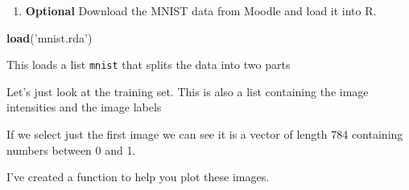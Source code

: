 \documentclass[]{book}
\newenvironment{Shaded}{\begin{snugshade}}{\end{snugshade}}
\newcommand{\CommentTok}[1]{\textcolor[rgb]{0.56,0.35,0.01}{\textit{#1}}}
\newcommand{\DecValTok}[1]{\textcolor[rgb]{0.00,0.00,0.81}{#1}}
\newcommand{\KeywordTok}[1]{\textcolor[rgb]{0.13,0.29,0.53}{\textbf{#1}}}
\newcommand{\NormalTok}[1]{#1}
\newcommand{\OperatorTok}[1]{\textcolor[rgb]{0.81,0.36,0.00}{\textbf{#1}}}
\newcommand{\StringTok}[1]{\textcolor[rgb]{0.31,0.60,0.02}{#1}}
\providecommand{\tightlist}{%
  \setlength{\itemsep}{0pt}\setlength{\parskip}{0pt}}
\theoremstyle{definition}
\theoremstyle{definition}
\theoremstyle{definition}
\theoremstyle{remark}
\begin{document}
\begin{enumerate}
\def\labelenumi{\arabic{enumi}.}
\setcounter{enumi}{4}
\tightlist
\item
  \textbf{Optional} Download the MNIST data from Moodle and load it into R.
\end{enumerate}

\begin{Shaded}
\begin{Highlighting}[]
\KeywordTok{load}\NormalTok{(}\StringTok{'mnist.rda'}\NormalTok{)}
\end{Highlighting}
\end{Shaded}

This loads a list \texttt{mnist} that splits the data into two parts

\begin{Shaded}
\end{Shaded}

Let's just look at the training set. This is also a list containing the image intensities and the image labels

\begin{Shaded}
\end{Shaded}

If we select just the first image we can see it is a vector of length 784 containing numbers between 0 and 1.

\begin{Shaded}
\end{Shaded}

I've created a function to help you plot these images.
\end{document}
